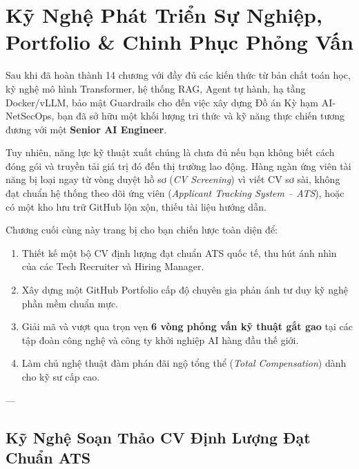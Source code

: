 
\chapter{Kỹ Nghệ Phát Triển Sự Nghiệp, Portfolio \& Chinh Phục Phỏng Vấn}
\label{ch:career-portfolio-interviews}

Sau khi đã hoàn thành 14 chương với đầy đủ các kiến thức từ bản chất toán học, kỹ nghệ mô hình Transformer, hệ thống RAG, Agent tự hành, hạ tầng Docker/vLLM, bảo mật Guardrails cho đến việc xây dựng Đồ án Kỳ hạm AI-NetSecOps, bạn đã sở hữu một khối lượng tri thức và kỹ năng thực chiến tương đương với một \textbf{Senior AI Engineer}.

Tuy nhiên, năng lực kỹ thuật xuất chúng là chưa đủ nếu bạn không biết cách đóng gói và truyền tải giá trị đó đến thị trường lao động. Hàng ngàn ứng viên tài năng bị loại ngay từ vòng duyệt hồ sơ (\textit{CV Screening}) vì viết CV sơ sài, không đạt chuẩn hệ thống theo dõi ứng viên (\textit{Applicant Tracking System -- ATS}), hoặc có một kho lưu trữ GitHub lộn xộn, thiếu tài liệu hướng dẫn.

Chương cuối cùng này trang bị cho bạn chiến lược toàn diện để:
\begin{enumerate}
  \item Thiết kế một bộ CV định lượng đạt chuẩn ATS quốc tế, thu hút ánh nhìn của các Tech Recruiter và Hiring Manager.
  \item Xây dựng một GitHub Portfolio cấp độ chuyên gia phản ánh tư duy kỹ nghệ phần mềm chuẩn mực.
  \item Giải mã và vượt qua trọn vẹn \textbf{6 vòng phỏng vấn kỹ thuật gắt gao} tại các tập đoàn công nghệ và công ty khởi nghiệp AI hàng đầu thế giới.
  \item Làm chủ nghệ thuật đàm phán đãi ngộ tổng thể (\textit{Total Compensation}) dành cho kỹ sư cấp cao.
\end{enumerate}

---

\section{Kỹ Nghệ Soạn Thảo CV Định Lượng Đạt Chuẩn ATS}
\label{sec:ch15-ats-resume}

